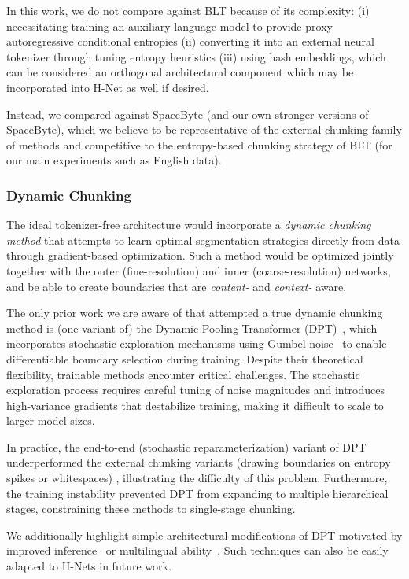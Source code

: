 In this work, we do not compare against BLT because of its complexity: (i) necessitating training an auxiliary language model to provide proxy autoregressive conditional entropies (ii) converting it into an external neural tokenizer through tuning entropy heuristics (iii) using hash embeddings, which can be considered an orthogonal architectural component which may be incorporated into H-Net as well if desired.

Instead, we compared against SpaceByte (and our own stronger versions of SpaceByte), which we believe to be representative of the external-chunking family of methods and competitive to the entropy-based chunking strategy of BLT (for our main experiments such as English data).

\subsubsection{Dynamic Chunking}

The ideal tokenizer-free architecture would incorporate a \emph{dynamic chunking method} that attempts to learn optimal segmentation strategies directly from data through gradient-based optimization.
Such a method would be optimized jointly together with the outer (fine-resolution) and inner (coarse-resolution) networks, and be able to create boundaries that are \emph{content-} and \emph{context-} aware.

The only prior work we are aware of that attempted a true dynamic chunking method is (one variant of) the Dynamic Pooling Transformer (DPT)~\citep{DPT}, 
which incorporates stochastic exploration mechanisms using Gumbel noise~\citep{GumbelSoftmax,maddison2017concrete} to enable differentiable boundary selection during training.
Despite their theoretical flexibility, trainable methods encounter critical challenges.
The stochastic exploration process requires careful tuning of noise magnitudes and introduces high-variance gradients that destabilize training, making it difficult to scale to larger model sizes.

In practice, the end-to-end (stochastic reparameterization) variant of DPT underperformed the external chunking variants (drawing boundaries on entropy spikes or whitespaces) \citep{DPT}, illustrating the difficulty of this problem.
Furthermore, the training instability prevented DPT from expanding to multiple hierarchical stages, constraining these methods to single-stage chunking. 

We additionally highlight simple architectural modifications of DPT motivated by improved inference~\citep{fleshman2023toucan} or multilingual ability~\citep{MAGNET}.
Such techniques can also be easily adapted to H-Nets in future work.

